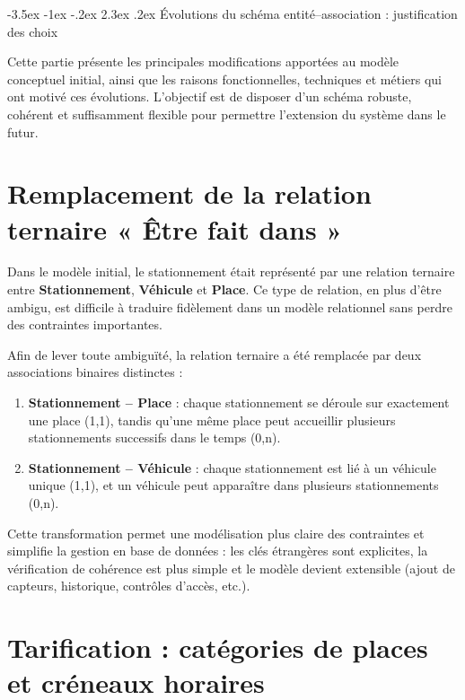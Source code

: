 \documentclass[a4paper,12pt]{report}
\makeatletter
\def\chapter{\@startsection {chapter}{0}{\z@}
                                   {-3.5ex \@plus -1ex \@minus -.2ex}
                                   {2.3ex \@plus.2ex}
                                   {\normalfont\huge\bfseries}}
\makeatother
\begin{document}
\chapter{Évolutions du schéma entité–association : justification des choix}
\label{sec:evolutions-ee}

Cette partie présente les principales modifications apportées au modèle conceptuel initial, 
ainsi que les raisons fonctionnelles, techniques et métiers qui ont motivé ces évolutions. 
L’objectif est de disposer d’un schéma robuste, cohérent et suffisamment flexible pour 
permettre l’extension du système dans le futur.


\section{Remplacement de la relation ternaire « Être fait dans »}
\label{subsec:relation-ternaire}

Dans le modèle initial, le stationnement était représenté par une relation ternaire 
entre \textbf{Stationnement}, \textbf{Véhicule} et \textbf{Place}. Ce type de relation, 
en plus d'être ambigu, est difficile à traduire fidèlement dans un modèle relationnel 
sans perdre des contraintes importantes.

Afin de lever toute ambiguïté, la relation ternaire a été remplacée par deux associations 
binaires distinctes :

\begin{enumerate}
    \item \textbf{Stationnement -- Place} : chaque stationnement se déroule sur exactement 
    une place (1,1), tandis qu'une même place peut accueillir plusieurs stationnements 
    successifs dans le temps (0,n).

    \item \textbf{Stationnement -- Véhicule} : chaque stationnement est lié à un véhicule 
    unique (1,1), et un véhicule peut apparaître dans plusieurs stationnements (0,n).
\end{enumerate}

Cette transformation permet une modélisation plus claire des contraintes et simplifie 
la gestion en base de données : les clés étrangères sont explicites, la vérification 
de cohérence est plus simple et le modèle devient extensible (ajout de capteurs, 
historique, contrôles d’accès, etc.).


\section{Tarification : catégories de places et créneaux horaires}
\label{subsec:tarification}
\end{document}
